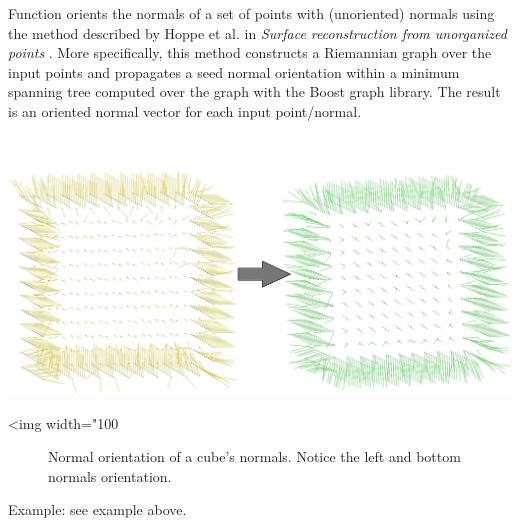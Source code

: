 Function  orients the normals of a set of points with (unoriented) normals using the method described by Hoppe et al. in {\em Surface reconstruction from unorganized points} \cite{cgal:hddms-srup-92}. More specifically, this method constructs a Riemannian graph over the input points and propagates a seed normal orientation within a minimum spanning tree computed over the graph with the Boost graph library. The result is an oriented normal vector for each input point/normal.

  \\

\begin{center}
    \label{Point_set_processing_3-fig-mst_orient_normals}
    \begin{ccTexOnly}
        \includegraphics[width=1.0\textwidth]{Point_set_processing_3/mst_orient_normals} %
    \end{ccTexOnly}
    \begin{ccHtmlOnly}
        <img width="100%
    \end{ccHtmlOnly}
    \begin{figure}[h]
        \caption{Normal orientation of a cube's normals. Notice the left and bottom normals orientation.}
    \end{figure}
\end{center}

Example: see  example above.



